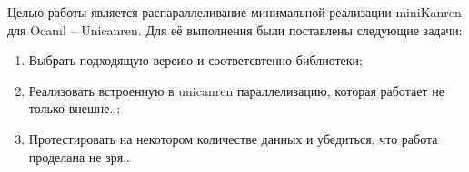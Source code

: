 
\label{sec:task}
 Целью работы является распараллеливание минимальной реализации miniKanren для Ocaml -- Unicanren. Для её выполнения были поставлены следующие задачи:
 \begin{enumerate}
 \item  Выбрать подходящую версию и соответсвтенно библиотеки;
 \item  Реализовать встроенную в unicanren параллелизацию, которая работает не только внешне..;
 \item  Протестировать на некотором количестве данных и убедиться, что работа проделана не зря..
 \end{enumerate}
